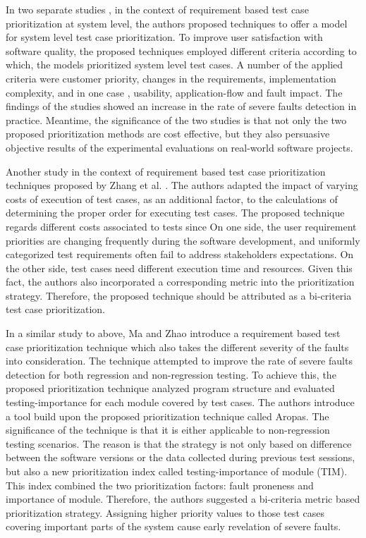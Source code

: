 \documentclass{sig-alternate}
\begin{document}
In two separate studies \cite{Kavitha:requirement}, \cite{krish:varying} in the context of requirement based test case prioritization at system level, the authors proposed techniques to offer a model for system level test case prioritization. To improve user satisfaction with software quality, the proposed techniques employed different criteria according to which, the models prioritized system level test cases. A number of the applied criteria were customer priority, changes in the requirements, implementation complexity, and in one case \cite{krish:varying}, usability, application-flow and fault impact. The findings of the studies showed an increase in the rate of severe faults detection in practice. Meantime, the significance of the two studies is that not only the two proposed prioritization methods are cost effective, but they also persuasive objective results of the experimental evaluations on real-world software projects.

Another study in the context of requirement based test case prioritization techniques proposed by Zhang et al. \cite{zhang:costs}. The authors adapted the impact of varying costs of execution of test cases, as an additional factor, to the calculations of determining the proper order for executing test cases. The proposed technique regards different costs associated to tests since On one side, the user requirement priorities are changing frequently during the software development, and uniformly categorized test requirements often fail to address stakeholders\textsc{} expectations. On the other side, test cases need different execution time and resources. Given this fact, the authors also incorporated a corresponding metric into the prioritization strategy. Therefore, the proposed technique should be attributed as a bi-criteria test case prioritization. 

In a similar study to above, Ma and Zhao \cite{ma:structure} introduce a requirement based test case prioritization technique which also takes the different severity of the faults into consideration. The technique attempted to improve the rate of severe faults\textsc{} detection for both regression and non-regression testing. To achieve this, the proposed prioritization technique analyzed program structure and evaluated testing-importance for each module covered by test cases. The authors introduce a tool build upon the proposed prioritization technique called Aropas. The significance of the technique is that it is either applicable to non-regression testing scenarios. The reason is that the strategy is not only based on difference between the software versions or the data collected during previous test sessions, but also a new prioritization index called testing-importance of module (TIM). This index combined the two prioritization factors: fault proneness and importance of module. Therefore, the authors suggested a bi-criteria metric based prioritization strategy. Assigning higher priority values to those test cases covering important parts of the system cause early revelation of severe faults.  
\end{document}

